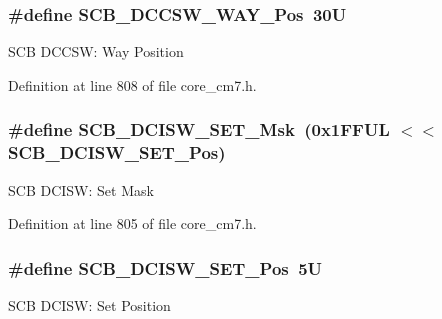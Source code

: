 \subsubsection[{\texorpdfstring{S\+C\+B\+\_\+\+D\+C\+C\+S\+W\+\_\+\+W\+A\+Y\+\_\+\+Pos}{SCB_DCCSW_WAY_Pos}}]{\setlength{\rightskip}{0pt plus 5cm}\#define S\+C\+B\+\_\+\+D\+C\+C\+S\+W\+\_\+\+W\+A\+Y\+\_\+\+Pos~30U}\hypertarget{group___c_m_s_i_s___s_c_b_ga6cac2d69791e13af276d8306c796925f}{}\label{group___c_m_s_i_s___s_c_b_ga6cac2d69791e13af276d8306c796925f}
S\+CB D\+C\+C\+SW\+: Way Position 

Definition at line 808 of file core\+\_\+cm7.\+h.

\subsubsection[{\texorpdfstring{S\+C\+B\+\_\+\+D\+C\+I\+S\+W\+\_\+\+S\+E\+T\+\_\+\+Msk}{SCB_DCISW_SET_Msk}}]{\setlength{\rightskip}{0pt plus 5cm}\#define S\+C\+B\+\_\+\+D\+C\+I\+S\+W\+\_\+\+S\+E\+T\+\_\+\+Msk~(0x1\+F\+F\+U\+L $<$$<$ S\+C\+B\+\_\+\+D\+C\+I\+S\+W\+\_\+\+S\+E\+T\+\_\+\+Pos)}\hypertarget{group___c_m_s_i_s___s_c_b_gab08fbef94f7d068a7c0217e074c697f9}{}\label{group___c_m_s_i_s___s_c_b_gab08fbef94f7d068a7c0217e074c697f9}
S\+CB D\+C\+I\+SW\+: Set Mask 

Definition at line 805 of file core\+\_\+cm7.\+h.

\subsubsection[{\texorpdfstring{S\+C\+B\+\_\+\+D\+C\+I\+S\+W\+\_\+\+S\+E\+T\+\_\+\+Pos}{SCB_DCISW_SET_Pos}}]{\setlength{\rightskip}{0pt plus 5cm}\#define S\+C\+B\+\_\+\+D\+C\+I\+S\+W\+\_\+\+S\+E\+T\+\_\+\+Pos~5U}\hypertarget{group___c_m_s_i_s___s_c_b_gaea6bd5b7d1c47c7db06afdecc6e49281}{}\label{group___c_m_s_i_s___s_c_b_gaea6bd5b7d1c47c7db06afdecc6e49281}
S\+CB D\+C\+I\+SW\+: Set Position 

